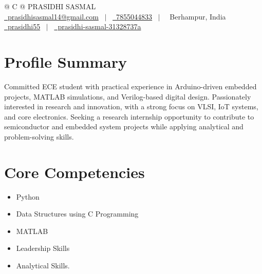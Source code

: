 \documentclass[a4paper,12pt]{article}
\begin{document}
\pagestyle{empty} 



\begin{tabularx}{\linewidth}{@{} C @{}}
\Huge{PRASIDHI SASMAL} \\[7.5pt]
\href{mailto:prasidhisasmal14@gmail.com}{\raisebox{-0.05\height}\faEnvelope \ prasidhisasmal14@gmail.com} \ $|$ \ 
\href{tel:+917855044833}{\raisebox{-0.05\height}\faMobile \ 7855044833} \ $|$ \ 
\raisebox{-0.05\height}\faMapMarker \ Berhampur, India \\[4pt]
\href{https://github.com/prasidhi55}{\raisebox{-0.05\height}\faGithub \ prasidhi55} \ $|$ \ 
\href{https://www.linkedin.com/in/prasidhi-sasmal-31328737a}{\raisebox{-0.05\height}\faLinkedin \ prasidhi-sasmal-31328737a} \\
\end{tabularx}


\section{Profile Summary}
Committed ECE student with practical experience in Arduino-driven embedded projects, MATLAB simulations, and Verilog-based digital design. Passionately interested in research and innovation, with a strong focus on VLSI, IoT systems, and core electronics. Seeking a research internship opportunity to contribute to semiconductor and embedded system projects while applying analytical and problem-solving skills.

\section{Core Competencies}
\begin{itemize}[nosep,after=\strut, leftmargin=1em, itemsep=3pt,label=--]
    \item Python
    \item Data Structures using C Programming
    \item MATLAB
    \item Leadership Skills
    \item Analytical Skills.
\end{itemize}
  
\end{document}
